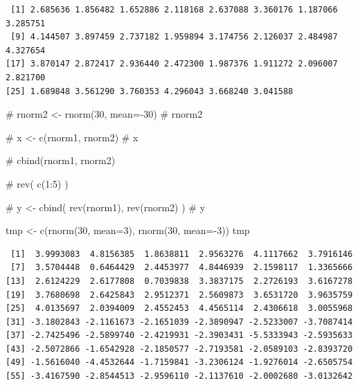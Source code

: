 \documentclass[
  letterpaper,
  DIV=11,
  numbers=noendperiod]{scrartcl}
\newenvironment{Shaded}{\begin{snugshade}}{\end{snugshade}}
\newcommand{\AttributeTok}[1]{\textcolor[rgb]{0.40,0.45,0.13}{#1}}
\newcommand{\CommentTok}[1]{\textcolor[rgb]{0.37,0.37,0.37}{#1}}
\newcommand{\DecValTok}[1]{\textcolor[rgb]{0.68,0.00,0.00}{#1}}
\newcommand{\FunctionTok}[1]{\textcolor[rgb]{0.28,0.35,0.67}{#1}}
\newcommand{\NormalTok}[1]{\textcolor[rgb]{0.00,0.23,0.31}{#1}}
\newcommand{\OtherTok}[1]{\textcolor[rgb]{0.00,0.23,0.31}{#1}}
\newcommand{\SpecialCharTok}[1]{\textcolor[rgb]{0.37,0.37,0.37}{#1}}
\begin{document}
\begin{verbatim}
 [1] 2.685636 1.856482 1.652886 2.118168 2.637088 3.360176 1.187066 3.285751
 [9] 4.144507 3.897459 2.737182 1.959894 3.174756 2.126037 2.484987 4.327654
[17] 3.870147 2.872417 2.936440 2.472300 1.987376 1.911272 2.096007 2.821700
[25] 1.689848 3.561290 3.760353 4.296043 3.668240 3.041588
\end{verbatim}

\begin{Shaded}
\begin{Highlighting}[]
\CommentTok{\# rnorm2 \textless{}{-} rnorm(30, mean={-}30)}
\CommentTok{\# rnorm2}

\CommentTok{\# x \textless{}{-} c(rnorm1, rnorm2)}
\CommentTok{\# x}

\CommentTok{\# cbind(rnorm1, rnorm2)}

\CommentTok{\# rev( c(1:5) )}

\CommentTok{\# y \textless{}{-} cbind( rev(rnorm1), rev(rnorm2) )}
\CommentTok{\# y}
\end{Highlighting}
\end{Shaded}

\begin{Shaded}
\begin{Highlighting}[]
\NormalTok{tmp }\OtherTok{\textless{}{-}} \FunctionTok{c}\NormalTok{(}\FunctionTok{rnorm}\NormalTok{(}\DecValTok{30}\NormalTok{, }\AttributeTok{mean=}\DecValTok{3}\NormalTok{), }\FunctionTok{rnorm}\NormalTok{(}\DecValTok{30}\NormalTok{, }\AttributeTok{mean=}\SpecialCharTok{{-}}\DecValTok{3}\NormalTok{))}
\NormalTok{tmp}
\end{Highlighting}
\end{Shaded}

\begin{verbatim}
 [1]  3.9993083  4.8156385  1.8638811  2.9563276  4.1117662  3.7916146
 [7]  3.5704448  0.6464429  2.4453977  4.8446939  2.1598117  1.3365666
[13]  2.6124229  2.6177808  0.7039838  3.3837175  2.2726193  3.6167278
[19]  3.7680698  2.6425843  2.9512371  2.5609873  3.6531720  3.9635759
[25]  4.0135697  2.0394009  2.4552453  4.4565114  2.4306618  3.0055968
[31] -3.1802843 -2.1161673 -2.1651039 -2.3890947 -2.5233007 -3.7087414
[37] -2.7425496 -2.5899740 -2.4219931 -2.3903431 -5.5333943 -2.5935633
[43] -2.5072866 -1.6542928 -2.1850577 -2.7193581 -2.0589103 -2.8393720
[49] -1.5616040 -4.4532644 -1.7159841 -3.2306124 -1.9276014 -2.6505754
[55] -3.4167590 -2.8544513 -2.9596110 -2.1137610 -2.0002680 -3.0132642
\end{verbatim}
\end{document}
